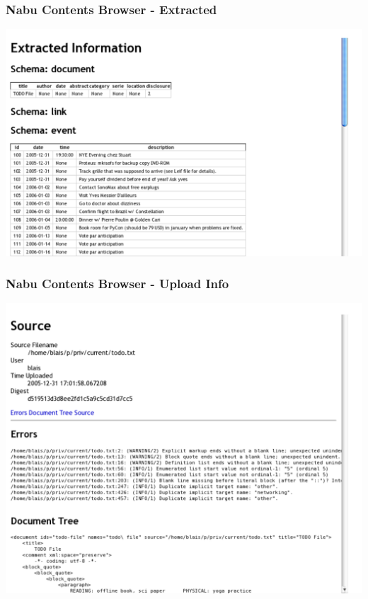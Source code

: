 \documentclass{beamer}
\begin{document}
\begin{frame}[fragile]
  \frametitle{Nabu Contents Browser - Extracted}

\includegraphics[width=1.0\textwidth]{ll-extracted.pdf}

\end{frame}


\begin{frame}[fragile]
  \frametitle{Nabu Contents Browser - Upload Info}

\includegraphics[width=1.0\textwidth]{ll-upload.pdf}

\end{frame}
\end{document}
